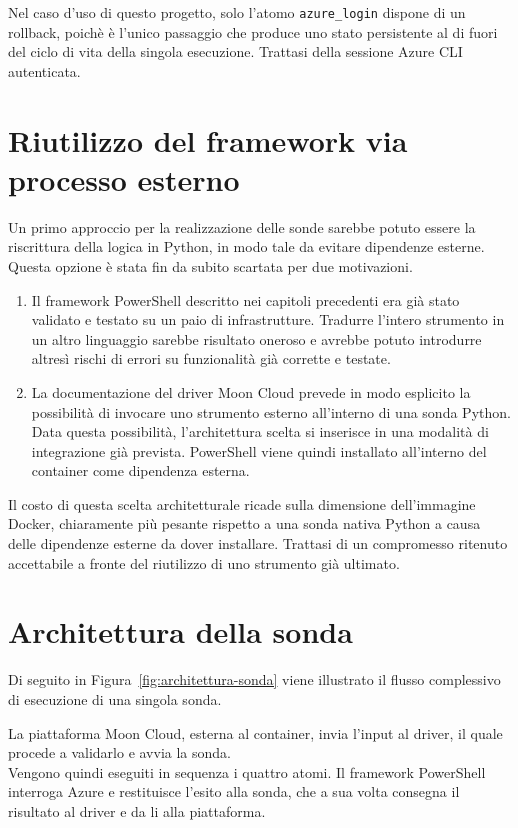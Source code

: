 \documentclass[a4paper,11pt]{report}
\begin{document}
Nel caso d'uso di questo progetto, solo l'atomo \texttt{azure\_login} dispone di un rollback, poichè è l'unico passaggio che produce uno stato persistente al di fuori del ciclo di vita della singola esecuzione. Trattasi della sessione Azure CLI autenticata.


\section{Riutilizzo del framework via processo esterno}

Un primo approccio per la realizzazione delle sonde sarebbe potuto essere la riscrittura della logica in Python, in modo tale da evitare dipendenze esterne.
Questa opzione è stata fin da subito scartata per due motivazioni.
\begin{enumerate}
\item Il framework PowerShell descritto nei capitoli precedenti era già stato validato e testato su un paio di infrastrutture.
Tradurre l'intero strumento in un altro linguaggio sarebbe risultato oneroso e avrebbe potuto introdurre altresì rischi di errori su funzionalità già corrette e testate.
\item La documentazione del driver Moon Cloud prevede in modo esplicito la possibilità di invocare uno strumento esterno all'interno di una sonda Python. Data questa possibilità, l'architettura scelta si inserisce in una modalità di integrazione già prevista. PowerShell viene quindi installato all'interno del container come dipendenza esterna.
\end{enumerate}

Il costo di questa scelta architetturale ricade sulla dimensione dell'immagine Docker, chiaramente più pesante rispetto a una sonda nativa Python a causa delle dipendenze esterne da dover installare. Trattasi di un compromesso ritenuto accettabile a fronte del riutilizzo di uno strumento già ultimato.

\section{Architettura della sonda}

Di seguito in Figura~\ref{fig:architettura-sonda} viene illustrato il flusso complessivo di esecuzione di una singola sonda. 

La piattaforma Moon Cloud, esterna al container, invia l'input al driver, il quale procede a validarlo e avvia la sonda.\\
Vengono quindi eseguiti in sequenza i quattro atomi. Il framework PowerShell interroga Azure e restituisce l'esito alla sonda, che a sua volta consegna il risultato al driver e da li alla piattaforma.
\end{document}
